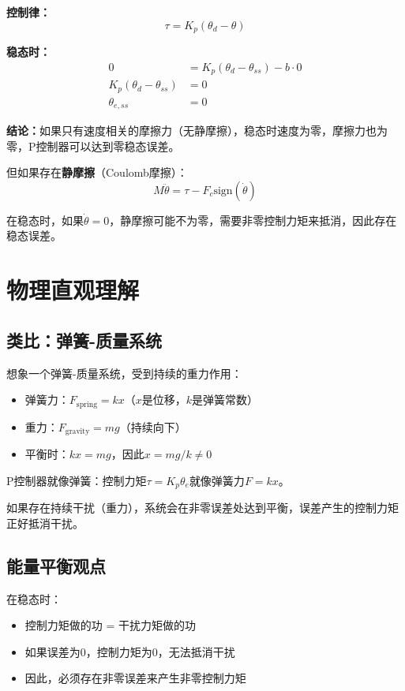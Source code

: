 \documentclass[12pt,a4paper]{article}
\begin{document}
\textbf{控制律：}
\begin{equation}
\tau = K_p(\theta_d - \theta)
\end{equation}

\textbf{稳态时：}
\begin{align}
0 &= K_p(\theta_d - \theta_{ss}) - b \cdot 0 \\
K_p(\theta_d - \theta_{ss}) &= 0 \\
\theta_{e,ss} &= 0
\end{align}

\textbf{结论：}如果只有速度相关的摩擦力（无静摩擦），稳态时速度为零，摩擦力也为零，P控制器可以达到零稳态误差。

但如果存在\textbf{静摩擦}（Coulomb摩擦）：
\begin{equation}
M\ddot{\theta} = \tau - F_c \text{sign}(\dot{\theta})
\end{equation}

在稳态时，如果$\dot{\theta} = 0$，静摩擦可能不为零，需要非零控制力矩来抵消，因此存在稳态误差。

\section{物理直观理解}

\subsection{类比：弹簧-质量系统}

想象一个弹簧-质量系统，受到持续的重力作用：

\begin{itemize}
\item 弹簧力：$F_{\text{spring}} = kx$（$x$是位移，$k$是弹簧常数）
\item 重力：$F_{\text{gravity}} = mg$（持续向下）
\item 平衡时：$kx = mg$，因此$x = mg/k \neq 0$
\end{itemize}

P控制器就像弹簧：控制力矩$\tau = K_p \theta_e$就像弹簧力$F = kx$。

如果存在持续干扰（重力），系统会在非零误差处达到平衡，误差产生的控制力矩正好抵消干扰。

\subsection{能量平衡观点}

在稳态时：
\begin{itemize}
\item 控制力矩做的功 = 干扰力矩做的功
\item 如果误差为0，控制力矩为0，无法抵消干扰
\item 因此，必须存在非零误差来产生非零控制力矩
\end{itemize}
\end{document}
